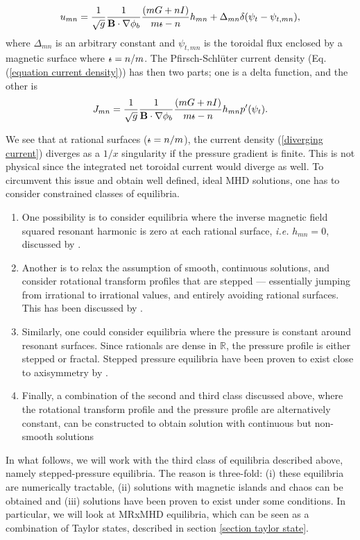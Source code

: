 \documentclass[my_thesis.tex]{subfiles}
\begin{document}
\begin{equation}
	u_{mn} = \frac{1}{\sqrt{g}}\frac{1}{\mathbf{B}\cdot\nabla\phi_b}\frac{(mG + nI)}{m\text{$\iota\!\!$-} - n}h_{mn} + \Delta_{mn}\delta(\psi_t-\psi_{t,mn}),
\end{equation}
where $\Delta_{mn}$ is an arbitrary constant and $\psi_{t,mn}$ is the toroidal flux enclosed by a magnetic surface where $\text{$\iota\!\!$-}=n/m$. The Pfirsch-Schl\"uter current density (Eq.(\ref{equation current density})) has then two parts; one is a delta function, and the other is
\begin{equation}
	J_{mn} = \frac{1}{\sqrt{g}}\frac{1}{\mathbf{B}\cdot\nabla\phi_b}\frac{(mG + nI)}{m\text{$\iota\!\!$-} - n}h_{mn}p'(\psi_t).\label{diverging current}
\end{equation}

We see that at rational surfaces ($\text{$\iota\!\!$-}=n/m$), the current density (\ref{diverging current}) diverges as a $1/x$ singularity if the pressure gradient is finite. This is not physical since the integrated net toroidal current would diverge as well. To circumvent this issue and obtain well defined, ideal MHD solutions, one has to consider constrained classes of equilibria.
\begin{enumerate}
	\item One possibility is to consider equilibria where the inverse magnetic field squared resonant harmonic is zero at each rational surface, \emph{i.e.} $h_{mn}=0$, discussed by \citet{Weitzner2014}.
	\item Another is to relax the assumption of smooth, continuous solutions, and consider rotational transform profiles that are stepped --- essentially jumping from irrational to irrational values, and entirely avoiding rational surfaces. This has been discussed by \citet{Loizu2015a}.
	\item Similarly, one could consider equilibria where the pressure is constant around resonant surfaces. Since rationals are dense in $\mathbb{R}$, the pressure profile is either stepped or fractal. Stepped pressure equilibria have been proven to exist close to axisymmetry by \citet{Bruno1996}.
	\item Finally, a combination of the second and third class discussed above, where the rotational transform profile and the pressure profile are alternatively constant, can be constructed to obtain solution with continuous but non-smooth solutions \citep{Hudson2017a}
\end{enumerate}
In what follows, we will work with the third class of equilibria described above, namely stepped-pressure equilibria. The reason is three-fold: (i) these equilibria are numerically tractable, (ii) solutions with magnetic islands and chaos can be obtained and (iii) solutions have been proven to exist under some conditions. In particular, we will look at \ac{MRxMHD} equilibria, which can be seen as a combination of Taylor states, described in section \ref{section taylor state}.
\end{document}
